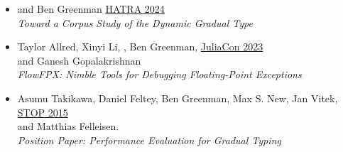 \documentclass[11pt]{article}
\begin{document}
\begin{itemize}
  \item
     and Ben Greenman \hfill \href{https://2024.splashcon.org/home/hatra-2024}{HATRA 2024} \\
      \emph{Toward a Corpus Study of the Dynamic Gradual Type}
  \item
    Taylor Allred, Xinyi Li, , Ben Greenman, \hfill \href{https://juliacon.org/2023/}{JuliaCon 2023} \\
     and Ganesh Gopalakrishnan  \\
     \emph{FlowFPX: Nimble Tools for Debugging Floating-Point Exceptions}
  \item
    Asumu Takikawa, Daniel Feltey, Ben Greenman, Max S. New, Jan Vitek, \hfill \href{https://2015.ecoop.org/track/STOP2015}{STOP 2015} \\
     and Matthias Felleisen. \\
     \emph{Position Paper: Performance Evaluation for Gradual Typing}
\end{itemize}
\end{document}

